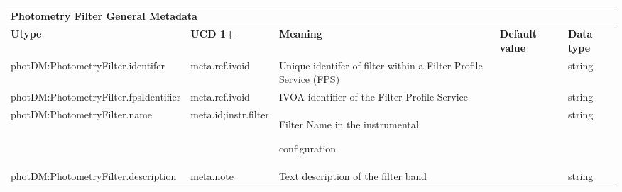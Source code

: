 \documentclass[11pt,a4paper]{ivoa}
\begin{document}
\begin{appendices}
\newpage
\begin{table}[H]
\centering
\begin{adjustbox}{angle=90}
\begin{tabular}{p{7in}p{0.87in}p{0.91in}p{0.4in}p{0.25in}}
\hline
\multicolumn{5}{p{\dimexpr6.59in+8\tabcolsep\relax}}{\centering 
{\fontsize{10pt}{12.0pt}\selectfont \textbf{Photometry Filter General Metadata}}} \\
\hline
\multicolumn{1}{p{5in}}{{\fontsize{10pt}{12.0pt}\selectfont \textbf{Utype}}} &
\multicolumn{1}{p{0.87in}}{{\fontsize{10pt}{12.0pt}\selectfont \textbf{UCD 1+}}} &
\multicolumn{1}{p{0.91in}}{{\fontsize{10pt}{12.0pt}\selectfont \textbf{Meaning}}} &
\multicolumn{1}{p{0.74in}}{{\fontsize{10pt}{12.0pt}\selectfont \textbf{Default value}}} &
\multicolumn{1}{p{0.35in}}{{\fontsize{10pt}{12.0pt}\selectfont \textbf{Data type}}} \\
\hline
\multicolumn{1}{p{5in}}{{\fontsize{10pt}{12.0pt}\selectfont photDM:PhotometryFilter.identifer}} &
\multicolumn{1}{p{0.87in}}{{\fontsize{10pt}{12.0pt}\selectfont meta.ref.ivoid }} &

\multicolumn{1}{p{0.91in}}{{\fontsize{10pt}{12.0pt}\selectfont Unique identifer of 
filter within a Filter Profile Service (FPS)}} &
\multicolumn{1}{p{0.74in}}{} &
\multicolumn{1}{p{0.35in}}{{\fontsize{10pt}{12.0pt}\selectfont string}} \\
\hline
\multicolumn{1}{p{5in}}{{\fontsize{10pt}{12.0pt}\selectfont photDM:PhotometryFilter.fpsIdentifier}} &
\multicolumn{1}{p{0.87in}}{{\fontsize{10pt}{12.0pt}\selectfont meta.ref.ivoid }} &

\multicolumn{1}{p{0.91in}}{{\fontsize{10pt}{12.0pt}\selectfont IVOA identifier of the 
Filter Profile Service}} &
\multicolumn{1}{p{0.74in}}{} &
\multicolumn{1}{p{0.35in}}{{\fontsize{10pt}{12.0pt}\selectfont string}} \\
\hline
\multicolumn{1}{p{5in}}{{\fontsize{10pt}{12.0pt}\selectfont photDM:PhotometryFilter.name}} &
\multicolumn{1}{p{0.87in}}{{\fontsize{10pt}{12.0pt}\selectfont meta.id;instr.filter }} &
\multicolumn{1}{p{0.91in}}{{\fontsize{10pt}{12.0pt}\selectfont Filter Name in the instrumental } 
\par {\fontsize{10pt}{12.0pt}\selectfont configuration\  }} &
\multicolumn{1}{p{0.74in}}{} &
\multicolumn{1}{p{0.35in}}{{\fontsize{10pt}{12.0pt}\selectfont string}} \\
\hline
\multicolumn{1}{p{5in}}{{\fontsize{10pt}{12.0pt}\selectfont photDM:PhotometryFilter.description}} &
\multicolumn{1}{p{0.87in}}{{\fontsize{10pt}{12.0pt}\selectfont meta.note }} &
\multicolumn{1}{p{0.91in}}{{\fontsize{10pt}{12.0pt}\selectfont Text description of the filter band}} &
\multicolumn{1}{p{0.74in}}{} &
\multicolumn{1}{p{0.35in}}{{\fontsize{10pt}{12.0pt}\selectfont string}} \\
\hline


\end{tabular}
\end{adjustbox}
\end{table}
\end{appendices}
\end{document}
